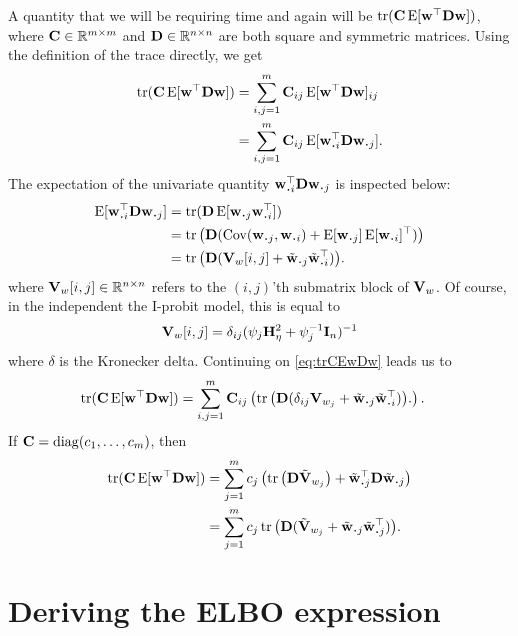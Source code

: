 A quantity that we will be requiring time and again will be $\operatorname{tr}({\mathbf C}\operatorname{E}[{\mathbf w}^\top{\mathbf D}{\mathbf w} ])$, where ${\mathbf C} \in \mathbb{R}^{m \times m}$ and ${\mathbf D} \in \mathbb{R}^{n \times n}$ are both square and symmetric matrices.
Using the definition of the trace directly, we get
\begin{align}
  \tr(\bC\E[\bw^\top\bD\bw ])
  &= \sum_{i,j=1}^m \bC_{ij} \E[\bw^\top\bD\bw ]_{ij} \nonumber \\
  &= \sum_{i,j=1}^m \bC_{ij} \E[\bw_{\bigcdot i}^\top\bD\bw_{\bigcdot j} ]. \label{eq:trCEwDw}
\end{align}
The expectation of the univariate quantity $\bw_{\bigcdot i}^\top\bD\bw_{\bigcdot j}$ is inspected below:
\begin{align*}
  \E[\bw_{\bigcdot i}^\top\bD\bw_{\bigcdot j}]
  &= \tr(\bD \E[\bw_{\bigcdot j}\bw_{\bigcdot i}^\top]) \\
  &= \tr\big(\bD (\Cov(\bw_{\bigcdot j},\bw_{\bigcdot i}) + \E[\bw_{\bigcdot j}]\E[\bw_{\bigcdot i}]^\top) \big) \\
  &= \tr\big(\bD (\bV_w[i,j]  + \tilde\bw_{\bigcdot j}\tilde\bw_{\bigcdot i}^\top)\big).
\end{align*}
where ${\mathbf V}_w[i,j] \in \mathbb{R}^{n\times n}$ refers to the $(i,j)$'th submatrix block of ${\mathbf V}_w$.
Of course, in the independent the I-probit model, this is equal to 
\[
  {\mathbf V}_w[i,j] = \delta_{ij}(\psi_j{\mathbf H}_\eta^2 + \psi_j^{-1}{\mathbf I}_n)^{-1}
\]
where $\delta$ is the Kronecker delta. 
Continuing on \cref{eq:trCEwDw} leads us to
\begin{align*}
  \tr(\bC\E[\bw^\top\bD\bw ])
  &= \sum_{i,j=1}^m \bC_{ij} \left( 
  \tr\big(\bD (\delta_{ij}\bV_{w_j}  + \tilde\bw_{\bigcdot j}\tilde\bw_{\bigcdot i}^\top)\big).
  \right).
\end{align*}
If ${\mathbf C} = \operatorname{diag}(c_1,\dots,c_m)$, then
\begin{align*}
  \tr(\bC\E[\bw^\top\bD\bw ]) 
  &= \sum_{j=1}^m c_j\left( 
  \tr \big( \bD \tilde\bV_{w_j} \big)  +
  \tilde\bw_{\bigcdot j}^\top \bD \tilde\bw_{\bigcdot j}
  \right) \\
  &= \sum_{j=1}^m c_j
  \tr \big( \bD (\tilde\bV_{w_j} + \tilde\bw_{\bigcdot j} \tilde\bw_{\bigcdot j}^\top) \big).
\end{align*}

\section{Deriving the ELBO expression}

